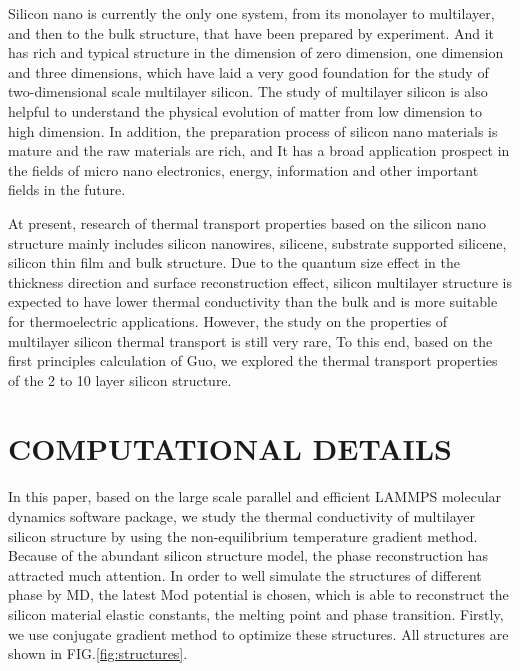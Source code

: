 \documentclass[%
 reprint,
 amsmath,amssymb,
 aps,
 prb,
]{revtex4-1}
\begin{document}
Silicon nano is currently the only one system, from its monolayer to multilayer, and then to the bulk structure, that have been prepared by experiment. And it has rich and typical structure in the dimension of zero dimension, one dimension and three dimensions, which have laid a very good foundation for the study of two-dimensional scale multilayer silicon. The study of multilayer silicon is also helpful to understand the physical evolution of matter from low dimension to high dimension. In addition, the preparation process of silicon nano materials is mature and the raw materials are rich, and It has a broad application prospect in the fields of micro nano electronics, energy, information and other important fields in the future.

At present, research of thermal transport properties based on the silicon nano structure mainly includes silicon nanowires\cite{Hochbaum2008,Yang2010,Shi2009,Boukai2008}, silicene\cite{Pei2013,Ng2013,Xie2014,Zhang2014,Liu2014}, substrate supported silicene\cite{Wang2015,Zhang2015a}, silicon thin film and bulk structure\cite{Bodapati2006,Tang2013Thermal,Jeong2012Thermal,Liu2006Thermal,Wang2006Lattice}. Due to the quantum size effect in the thickness direction and surface reconstruction effect, silicon multilayer structure is expected to have lower thermal conductivity than the bulk and is more suitable for thermoelectric applications. However, the study on the properties of multilayer silicon thermal transport is still very rare, To this end, based on the first principles calculation of Guo\cite{Guo2015Structural}, we explored the thermal transport properties of the 2 to 10 layer silicon structure.

\section{COMPUTATIONAL DETAILS}

In this paper, based on the large scale parallel and efficient LAMMPS molecular dynamics software package\cite{Parks2007}, we study the thermal conductivity of multilayer silicon structure by using the non-equilibrium temperature gradient method. Because of the abundant silicon structure model, the phase reconstruction has attracted much attention. In order to well simulate the structures of different phase by MD, the latest Mod potential is chosen\cite{Kumagai2007Development}, which is able to reconstruct the silicon material elastic constants, the melting point and phase transition. Firstly, we use conjugate gradient method to optimize these structures. All structures are shown in FIG.\ref{fig:structures}.
\end{document}
